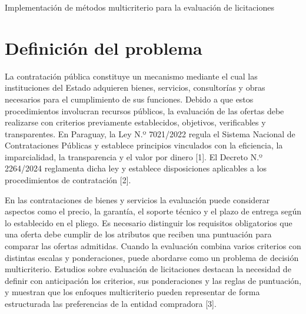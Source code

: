 \documentclass[12pt,a4paper]{article}
\begin{document}
\tableofcontents
\clearpage

\begin{center}
{\Large Implementación de métodos multicriterio para la evaluación de licitaciones}
\end{center}
\vspace{1.2cm}

\section{Definición del problema}

La contratación pública constituye un mecanismo mediante el cual las instituciones del Estado adquieren bienes, servicios, consultorías y obras necesarios para el cumplimiento de sus funciones. Debido a que estos procedimientos involucran recursos públicos, la evaluación de las ofertas debe realizarse con criterios previamente establecidos, objetivos, verificables y transparentes. En Paraguay, la Ley N.º 7021/2022 regula el Sistema Nacional de Contrataciones Públicas y establece principios vinculados con la eficiencia, la imparcialidad, la transparencia y el valor por dinero [1]. El Decreto N.º 2264/2024 reglamenta dicha ley y establece disposiciones aplicables a los procedimientos de contratación [2].

En las contrataciones de bienes y servicios la evaluación puede considerar aspectos como el precio, la garantía, el soporte técnico y el plazo de entrega según lo establecido en el pliego. Es necesario distinguir los requisitos obligatorios que una oferta debe cumplir de los atributos que reciben una puntuación para comparar las ofertas admitidas. Cuando la evaluación combina varios criterios con distintas escalas y ponderaciones, puede abordarse como un problema de decisión multicriterio. Estudios sobre evaluación de licitaciones destacan la necesidad de definir con anticipación los criterios, sus ponderaciones y las reglas de puntuación, y muestran que los enfoques multicriterio pueden representar de forma estructurada las preferencias de la entidad compradora [3].
\end{document}
